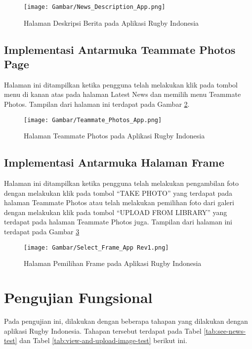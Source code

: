 \begin{figure} [H]
    \centering
    \texttt{[image: Gambar/News\_Description\_App.png]}
    \caption{Halaman Deskripsi Berita pada Aplikasi Rugby Indonesia}
    \label{fig:news-description-app}
\end{figure}

\subsection{Implementasi Antarmuka Teammate Photos Page}
Halaman ini ditampilkan ketika pengguna telah melakukan klik pada tombol menu di kanan atas pada halaman Latest News dan memilih menu Teammate Photos. Tampilan dari halaman ini terdapat pada Gambar \ref{fig:teammate-photos-app}.

\begin{figure} [H]
    \centering
    \texttt{[image: Gambar/Teammate\_Photos\_App.png]}
    \caption{Halaman Teammate Photos pada Aplikasi Rugby Indonesia}
    \label{fig:teammate-photos-app}
\end{figure}

\subsection{Implementasi Antarmuka Halaman Frame}
Halaman ini ditampilkan ketika pengguna telah melakukan pengambilan foto dengan melakukan klik pada tombol ``TAKE PHOTO'' yang terdapat pada halaman Teammate Photos atau telah melakukan pemilihan foto dari galeri dengan melakukan klik pada tombol ``UPLOAD FROM LIBRARY'' yang terdapat pada halaman Teammate Photos juga. Tampilan dari halaman ini terdapat pada Gambar \ref{fig:select-frame-app}

\begin{figure} [H]
    \centering
    \texttt{[image: Gambar/Select\_Frame\_App Rev1.png]}
    \caption{Halaman Pemilihan Frame pada Aplikasi Rugby Indonesia}
    \label{fig:select-frame-app}
\end{figure}

\section{Pengujian Fungsional}
Pada pengujian ini, dilakukan dengan beberapa tahapan yang dilakukan dengan aplikasi Rugby Indonesia. Tahapan tersebut terdapat pada Tabel \ref{tab:see-news-test} dan Tabel \ref{tab:view-and-upload-image-test} berikut ini.

